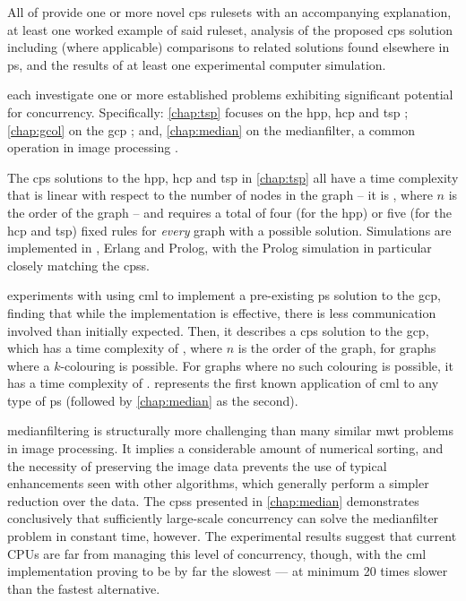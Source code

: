 All of  provide one or more novel \gls{cps} \glspl{ruleset} with an accompanying explanation, at least one worked example of said \gls{ruleset}, analysis of the proposed \gls{cps} solution including (where applicable) comparisons to related solutions found elsewhere in \gls{ps}, and the results of at least one experimental computer simulation.

 each investigate one or more established problems exhibiting significant potential for concurrency.  Specifically:  \cref{chap:tsp} focuses on the \gls{hpp}, \gls{hcp} and \gls{tsp} \cite{Applegate2006,Cook2012}; \cref{chap:gcol} on the \gls{gcp} \cite{Lewis2016}; and, \cref{chap:median} on the \gls{medianfilter}, a common operation in image processing \cite{Fisher2016,Gimelfarb2018}.

The \gls{cps} solutions to the \gls{hpp}, \gls{hcp} and \gls{tsp} in \cref{chap:tsp} all have a time complexity that is linear with respect to the number of nodes in the graph -- \ie{} it is , where \(n\) is the order of the graph -- and requires a total of four (for the \gls{hpp}) or five (for the \gls{hcp} and \gls{tsp}) fixed rules for \emph{every} graph with a possible solution.  Simulations are implemented in \fsharp{}, Erlang and Prolog, with the Prolog simulation in particular closely matching the \glspl{cps}.

 experiments with using \gls{cml} to implement a pre-existing \gls{ps} solution to the \gls{gcp}, finding that while the implementation is effective, there is less communication involved than initially expected.  Then, it describes a \gls{cps} solution to the \gls{gcp}, which has a time complexity of , where \(n\) is the order of the graph, for graphs where a \(k\)-colouring is possible.  For graphs where no such colouring is possible, it has a time complexity of .   represents the first known application of \gls{cml} to any type of \gls{ps} (followed by \cref{chap:median} as the second).

\Gls{medianfilter}ing is structurally more challenging than many similar \gls{mwt} problems in image processing.  It implies a considerable amount of numerical sorting, and the necessity of preserving the image data prevents the use of typical enhancements seen with other algorithms, which generally perform a simpler reduction over the data.  The \glspl{cps} presented in \cref{chap:median} demonstrates conclusively that sufficiently large-scale concurrency can solve the \gls{medianfilter} problem in constant time, however.  The experimental results suggest that current CPUs are far from managing this level of concurrency, though, with the \gls{cml} implementation proving to be by far the slowest --- at minimum 20 times slower than the fastest alternative.

